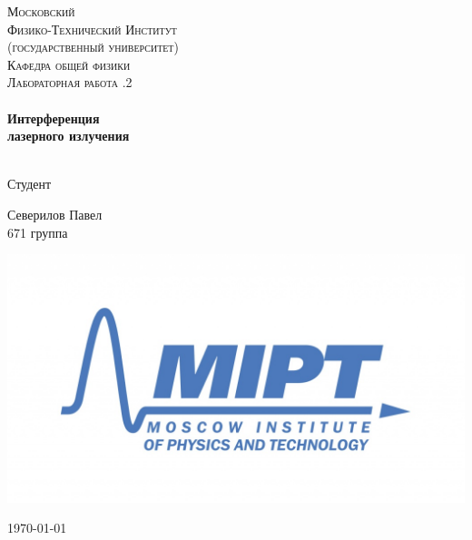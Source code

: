 \begin{titlepage}
\center %
 

\textsc{\LARGE Московский\\[-0.2cm]Физико-Технический Институт\\[0.1cm]\large (государственный университет)}\\[1.5cm] %
\textsc{\Large Кафедра общей физики}\\[0.1cm] %
\textsc{\large Лабораторная работа .2}\\[0.5cm] %


\HRule
\\[0.4cm]
{ \huge \bfseries Интерференция\\[0.2cm]
лазерного излучения}
\\[0.6cm] %
\HRule
\\[1.5cm]


 


	\begin{flushleft} \large
		\textsf{Студент}
		
		Северилов Павел \\[-0.15cm]
		671 группа
	\end{flushleft}


\begin{bottompar}
	\begin{center}
		\includegraphics[width = 80 mm]{logo.jpg}
	\end{center}
	{\large \today}

\end{bottompar}
\vfill %

\end{titlepage}